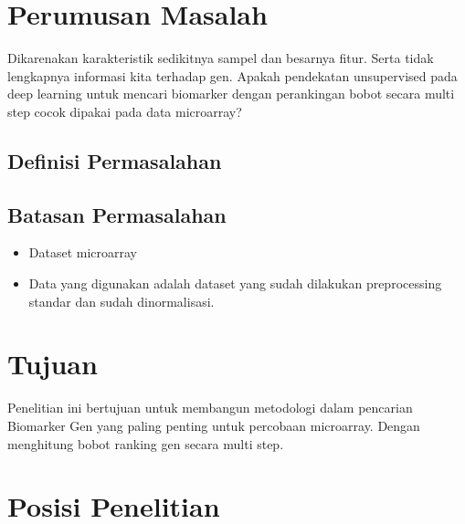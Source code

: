 \section{Perumusan Masalah}
Dikarenakan karakteristik sedikitnya sampel dan besarnya fitur. Serta tidak lengkapnya informasi kita terhadap gen. Apakah pendekatan unsupervised pada deep learning untuk mencari biomarker dengan perankingan bobot secara multi step cocok dipakai pada data microarray?


\subsection{Definisi Permasalahan}


\subsection{Batasan Permasalahan}
\begin{itemize}
\item Dataset microarray
\item Data yang digunakan adalah dataset yang sudah dilakukan preprocessing standar dan sudah dinormalisasi.
\end{itemize}

\section{Tujuan}
Penelitian ini bertujuan untuk membangun metodologi dalam pencarian Biomarker Gen yang paling penting untuk percobaan microarray. Dengan menghitung bobot ranking gen secara multi step.

\section{Posisi Penelitian}




